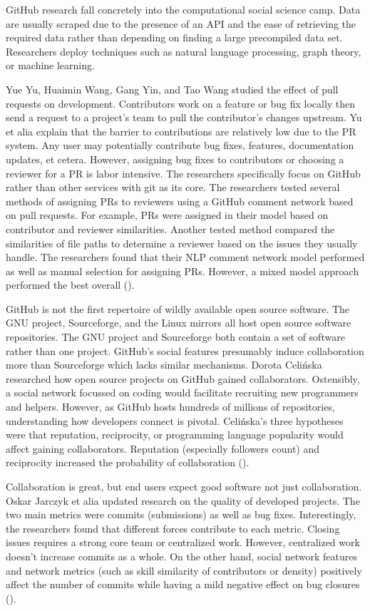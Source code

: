 \documentclass[12pt, a4paper]{article}
\begin{document}
GitHub research fall concretely into the computational social science camp. Data are usually scraped due to the presence of an API and the ease of retrieving the required data rather than depending on finding a large precompiled data set. Researchers deploy techniques such as natural language processing, graph theory, or machine learning.

Yue Yu, Huaimin Wang, Gang Yin, and Tao Wang studied the effect of pull requests on development. Contributors work on a feature or bug fix locally then send a request to a project's team to pull the contributor's changes upstream. Yu et alia explain that the barrier to contributions are relatively low due to the PR system. Any user may potentially contribute bug fixes, features, documentation updates, et cetera. However, assigning bug fixes to contributors or choosing a reviewer for a PR is labor intensive. The researchers specifically focus on GitHub rather than other services with git as its core. The researchers tested several methods of assigning PRs to reviewers using a GitHub comment network based on pull requests. For example, PRs were assigned in their model based on contributor and reviewer similarities. Another tested method compared the similarities of file paths to determine a reviewer based on the issues they usually handle. The researchers found that their NLP comment network model performed as well as manual selection for assigning PRs. However, a mixed model approach performed the best overall (\cite{YU2016204}).

GitHub is not the first repertoire of wildly available open source software. The GNU project, Sourceforge, and the Linux mirrors all host open source software repositories. The GNU project and Sourceforge both contain a set of software rather than one project. GitHub's social features presumably induce collaboration more than Sourceforge which lacks similar mechanisms. Dorota Celi\'{n}ska researched how open source projects on GitHub gained collaborators. Ostensibly, a social network focussed on coding would facilitate recruiting new programmers and helpers. However, as GitHub hosts hundreds of millions of repositories, understanding how developers connect is pivotal. Celi\'{n}ska's three hypotheses were that reputation, reciprocity, or programming language popularity would affect gaining collaborators. Reputation (especially followers count) and reciprocity increased the probability of collaboration (\cite{celinska2018}).

Collaboration is great, but end users expect good software not just collaboration. Oskar Jarczyk et alia updated research on the quality of developed projects. The two main metrics were commits (submissions) as well as bug fixes. Interestingly, the researchers found that different forces contribute to each metric. Closing issues requires a strong core team or centralized work. However, centralized work doesn't increase commits as a whole. On the other hand, social network features and network metrics (such as skill similarity of contributors or density) positively affect the number of commits while having a mild negative effect on bug closures (\cite{JARCZYK201832}).
\end{document}
